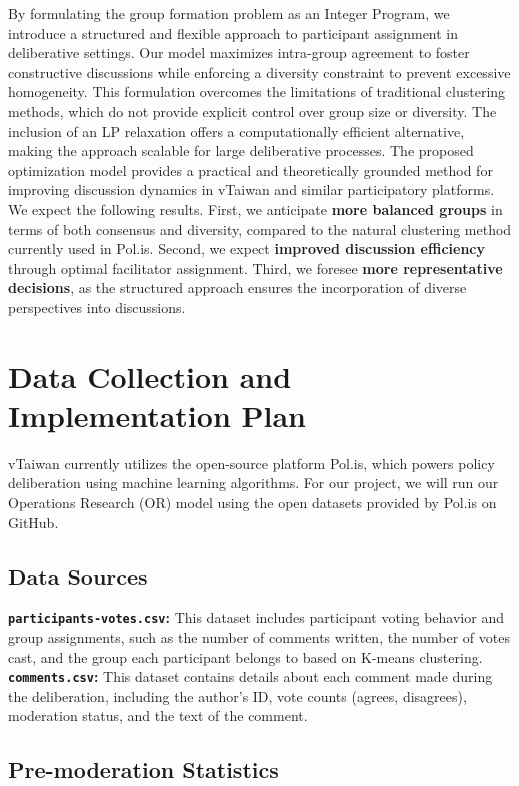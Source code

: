 \documentclass[11pt,a4paper]{article}
\begin{document}
By formulating the group formation problem as an Integer Program, we introduce a structured and flexible approach to participant assignment in deliberative settings. Our model maximizes intra-group agreement to foster constructive discussions while enforcing a diversity constraint to prevent excessive homogeneity. This formulation overcomes the limitations of traditional clustering methods, which do not provide explicit control over group size or diversity. The inclusion of an LP relaxation offers a computationally efficient alternative, making the approach scalable for large deliberative processes. The proposed optimization model provides a practical and theoretically grounded method for improving discussion dynamics in vTaiwan and similar participatory platforms. 
We expect the following results. First, we anticipate \textbf{more balanced groups} in terms of both consensus and diversity, compared to the natural clustering method currently used in Pol.is. Second, we expect \textbf{improved discussion efficiency} through optimal facilitator assignment. Third, we foresee \textbf{more representative decisions}, as the structured approach ensures the incorporation of diverse perspectives into discussions.

\section{Data Collection and Implementation Plan}

vTaiwan currently utilizes the open-source platform Pol.is, which powers policy deliberation using machine learning algorithms. For our project, we will run our Operations Research (OR) model using the open datasets provided by Pol.is on GitHub.

\subsection{Data Sources}

\textbf{\texttt{participants-votes.csv}:} This dataset includes participant voting behavior and group assignments, such as the number of comments written, the number of votes cast, and the group each participant belongs to based on K-means clustering. \\
\textbf{\texttt{comments.csv}:} This dataset contains details about each comment made during the deliberation, including the author’s ID, vote counts (agrees, disagrees), moderation status, and the text of the comment.

\subsection{Pre-moderation Statistics}
\end{document}
